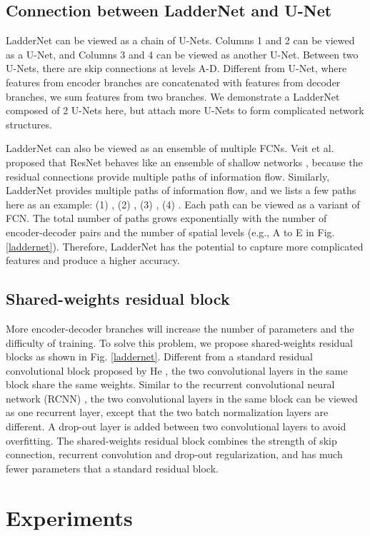 \documentclass{article}
\begin{document}
\subsection{Connection between LadderNet and U-Net}
LadderNet can be viewed as a chain of U-Nets. Columns 1 and 2 can be viewed as a U-Net, and Columns 3 and 4 can be viewed as another U-Net. Between two U-Nets, there are skip connections at levels A-D. Different from U-Net, where features from encoder branches are concatenated with features from decoder branches, we sum features from two branches. We demonstrate a LadderNet composed of 2 U-Nets here, but attach more U-Nets to form complicated network structures.
\par
LadderNet can also be viewed as an ensemble of multiple FCNs. Veit et al. proposed that ResNet behaves like an ensemble of shallow networks \cite{veit2016residual}, because the residual connections provide multiple paths of information flow. Similarly, LadderNet provides multiple paths of information flow, and we lists a few paths here as an example: (1) , (2) , (3) , (4) . Each path can be viewed as a variant of FCN. The total number of paths grows exponentially with the number of encoder-decoder pairs and the number of spatial levels (e.g., A to E in Fig. \ref{laddernet}). Therefore, LadderNet has the potential to capture more complicated features and produce a higher accuracy.
\vspace{-0.1cm}
\subsection{Shared-weights residual block}
More encoder-decoder branches will increase the number of parameters and the difficulty of training. To solve this problem, we propose shared-weights residual blocks as shown in Fig. \ref{laddernet}.  Different from a standard residual convolutional block proposed by He \cite{he2016deep}, the two convolutional layers in the same block share the same weights. Similar to the recurrent convolutional neural network (RCNN) \cite{alom2017inception}, the two convolutional layers in the same block can be viewed as one recurrent layer, except that the two batch normalization layers are different. A drop-out layer is added between two convolutional layers to avoid overfitting. The shared-weights residual block combines the strength of skip connection, recurrent convolution and drop-out regularization, and has much fewer parameters that a standard residual block. 

\section{Experiments}
\vspace{-0.1cm}
\end{document}
